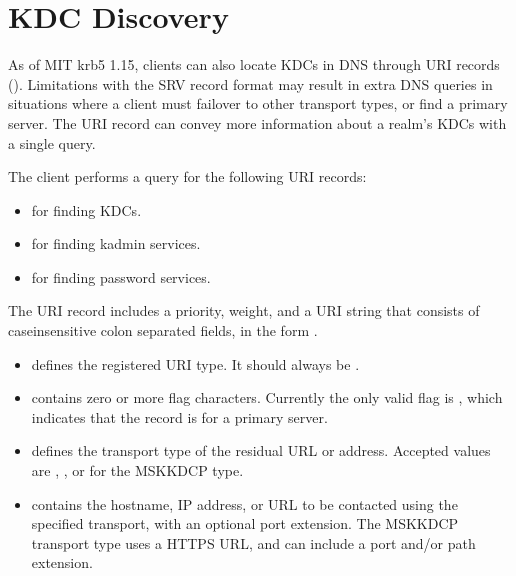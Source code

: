 \documentclass[letterpaper,10pt,english]{sphinxmanual}
\begin{document}
\section{KDC Discovery}
\label{\detokenize{admin/realm_config:kdc-discovery}}\label{\detokenize{admin/realm_config:id1}}
\sphinxAtStartPar
As of MIT krb5 1.15, clients can also locate KDCs in DNS through URI
records ().  Limitations with the SRV record format may
result in extra DNS queries in situations where a client must failover
to other transport types, or find a primary server.  The URI record
can convey more information about a realm’s KDCs with a single query.

\sphinxAtStartPar
The client performs a query for the following URI records:
\begin{itemize}
\item {} 
\sphinxAtStartPar
{} for finding KDCs.

\item {} 
\sphinxAtStartPar
{} for finding kadmin services.

\item {} 
\sphinxAtStartPar
{} for finding password services.

\end{itemize}

\sphinxAtStartPar
The URI record includes a priority, weight, and a URI string that
consists of case\sphinxhyphen{}insensitive colon separated fields, in the form
.
\begin{itemize}
\item {} 
\sphinxAtStartPar
{} defines the registered URI type.  It should always be
.

\item {} 
\sphinxAtStartPar
{} contains zero or more flag characters.  Currently the only
valid flag is , which indicates that the record is for a
primary server.

\item {} 
\sphinxAtStartPar
{} defines the transport type of the residual URL or
address.  Accepted values are , , or  for the
MS\sphinxhyphen{}KKDCP type.

\item {} 
\sphinxAtStartPar
{} contains the hostname, IP address, or URL to be
contacted using the specified transport, with an optional port
extension.  The MS\sphinxhyphen{}KKDCP transport type uses a HTTPS URL, and can
include a port and/or path extension.

\end{itemize}
\end{document}
